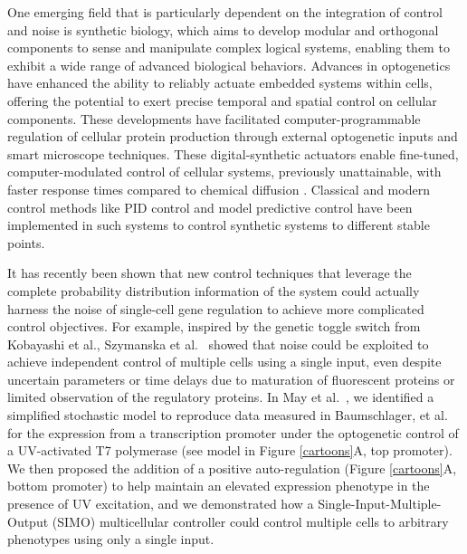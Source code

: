 \documentclass[12pt]{iopart}
\begin{document}
One emerging field that is particularly dependent on the integration of control and noise is synthetic biology, which aims to develop modular\cite{Ng2019} and orthogonal \cite{Liu2018} components to sense and manipulate \cite{Sheets2020} complex logical systems, enabling them to exhibit a wide range of advanced biological behaviors\cite{Shin2020}. 
Advances in optogenetics have enhanced the ability to reliably actuate embedded systems within cells, offering the potential to exert precise temporal and spatial control on cellular components\cite{Sheets2020,Baumschlager2017,Chen2020,Lillacci2018}.
These developments have facilitated computer-programmable regulation of cellular protein production through external optogenetic inputs and smart microscope techniques\cite{Fox2021,Baumschlager2021,Lugagne2017}. 
These digital-synthetic actuators enable fine-tuned, computer-modulated control of cellular systems, previously unattainable, with faster response times compared to chemical diffusion\cite{Rullan2018, Baumschlager2017} . 
Classical and modern control methods like PID control and model predictive control have been implemented in such systems  to control synthetic systems to different stable points. 

It has recently been shown that new control techniques that leverage the complete probability distribution information of the system could actually harness the noise of single-cell gene regulation to achieve more complicated control objectives. 
For example, inspired by the genetic toggle switch from Kobayashi et al.\cite{Kobayashi:2004}, Szymanska et al.~\cite{Szymanska2015} showed that noise could be exploited to achieve independent control of multiple cells using a single input, even despite uncertain parameters or time delays due to maturation of fluorescent proteins or limited observation of the regulatory proteins. 
In May et al.~\cite{May2021}, we identified a simplified stochastic model to reproduce data measured in Baumschlager, et al.  for the expression from a transcription promoter under the optogenetic control of a UV-activated T7 polymerase (see model in Figure \ref{cartoons}A, top promoter).
We then proposed the addition of a positive auto-regulation (Figure \ref{cartoons}A, bottom promoter) to help maintain an elevated expression phenotype in the presence of UV excitation, and we demonstrated how a Single-Input-Multiple-Output (SIMO) multicellular controller could control multiple cells to arbitrary phenotypes using only a single input. 
\end{document}
